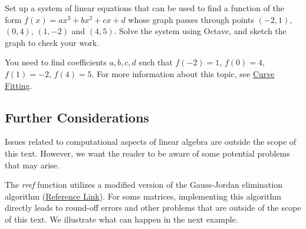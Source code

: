 \documentclass{ximera}
\begin{document}
\begin{problem}\label{prob_oct_sys_4}
    Set up a system of linear equations that can be used to find a function of the form $f(x)=ax^3+bx^2+cx+d$ whose graph passes through points $(-2, 1)$, $(0, 4)$, $(1, -2)$ and $(4, 5)$.   Solve the system using Octave, and sketch the graph to check your work.
    
    \begin{hint}
        You need to find coefficients $a, b, c, d$ such that $f(-2)=1$, $f(0)=4$, $f(1)=-2$, $f(4)=5$.  For more information about this topic, see \href{https://ximera.osu.edu/linearalgebradzv3/LinearAlgebraInteractiveIntro/APP-0070/main}{Curve Fitting}.
    \end{hint}
    

   \begin{center} 
    \end{center}
   
\end{problem}

\subsection*{Further Considerations}
Issues related to computational aspects of linear algebra are outside the scope of this text.  However, we want the reader to be aware of some potential problems that may arise.

\begin{warning}
    The \emph{rref} function utilizes a modified version of the Gauss-Jordan elimination algorithm (\href{https://www.mathworks.com/help/matlab/ref/rref.html}{Reference Link}).  For some matrices, implementing this algorithm directly leads to round-off errors and other problems that are outside of the scope of this text.  %
    We illustrate what can happen in the next example.   
\end{warning}
\end{document}
